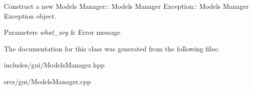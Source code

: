 Construct a new Models Manager\+:\+: Models Manager Exception\+:\+: Models Manager Exception object. 


\begin{DoxyParams}{Parameters}
{\em what\+\_\+arg} & Error message \\
\hline
\end{DoxyParams}


The documentation for this class was generated from the following files\+:\begin{DoxyCompactItemize}
\item 
includes/gui/Models\+Manager.\+hpp\item 
srcs/gui/Models\+Manager.\+cpp\end{DoxyCompactItemize}
